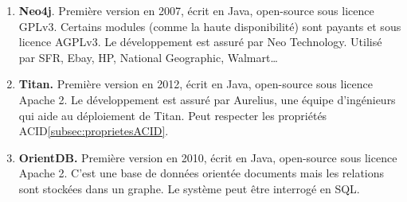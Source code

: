 	\begin{enumerate}
		\item \textbf{Neo4j}. Première version en 2007, écrit en Java, open-source sous licence GPLv3. Certains modules (comme la haute disponibilité) sont payants et sous licence AGPLv3. Le développement est assuré par Neo Technology. Utilisé par SFR, Ebay, HP, National Geographic, Walmart\dots
		\item \textbf{Titan.} Première version en 2012, écrit en Java, open-source sous licence Apache 2. Le développement est assuré par Aurelius, une équipe d'ingénieurs qui aide au déploiement de Titan. Peut respecter les propriétés ACID\ref{subsec:proprietesACID}.
		\item \textbf{OrientDB.} Première version en 2010, écrit en Java, open-source sous licence Apache 2. C'est une base de données orientée documents mais les relations sont stockées dans un graphe. Le système peut être interrogé en SQL.
	\end{enumerate}
